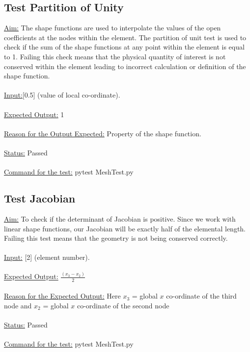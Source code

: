 \subsection{Test Partition of Unity}
\underline{Aim:} The shape functions are used to interpolate the values of the open coefficients at the nodes within the element. The partition of unit test is used to check if the sum of the shape functions at any point within the element is equal to 1. Failing this check means that the physical quantity of interest is not conserved within the element leading to incorrect calculation or definition of the shape function.\\ \\
\noindent \underline{Input:}[0.5] (value of local co-ordinate).\\ \\
\underline{Expected Output:} 1\\ \\
\underline{Reason for the Output Expected:} Property of the shape function.\\ \\
\underline{Status:} Passed\\ \\
\noindent \underline{Command for the test:} pytest Mesh\textunderscore Test.py\\

\subsection{Test Jacobian}
\underline{Aim:} To check if the determinant of Jacobian is positive. Since we work with linear shape functions, our Jacobian will be exactly half of the elemental length. Failing this test means that the geometry is not being conserved correctly.\\ \\
\noindent \underline{Input:} [2] (element number).\\ \\
\underline{Expected Output:} $\frac{(x_3-x_2)}{2} $ \\ \\
\underline{Reason for the Expected Output:} Here $x_3$ = global $x$ co-ordinate of the third node and $x_2$ = global $x$ co-ordinate of the second node\\ \\
\underline{Status:} Passed\\ \\
\noindent \underline{Command for the test:} pytest Mesh\textunderscore Test.py\\

